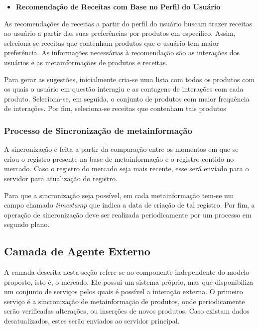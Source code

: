 \begin{itemize} 
    \item \textbf{Recomendação de Receitas com Base no Perfil do Usuário}
\end{itemize}

As recomendações de receitas a partir do perfil do usuário buscam trazer receitas ao usuário a partir das suas preferências por produtos em específico. Assim, seleciona-se receitas que contenham produtos que o usuário tem maior preferência. As informações necessárias à recomendação são as interações dos usuários e as metainformações de produtos e receitas.

Para gerar as sugestões, inicialmente cria-se uma lista com todos os produtos com os quais o usuário em questão interagiu e as contagens de interações com cada produto. Seleciona-se, em seguida, o conjunto de produtos com maior frequência de interações. Por fim, seleciona-se receitas que contenham tais produtos%

\ProximoForaDoSumario 
\subsubsection{Processo de Sincronização de metainformação}

A sincronização é feita a partir da comparação entre os momentos em que se criou o registro presente na base de metainformação e o registro contido no mercado. Caso o registro do mercado seja mais recente, esse será enviado para o servidor para atualização do registro. 

Para que a sincronização seja possível, em cada metainformação tem-se um campo chamado  \textit{timestamp} que indica a data de criação de tal registro. Por fim, a operação de sincronização deve ser realizada periodicamente por um processo em segundo plano. 


\subsection{Camada de Agente Externo}

A camada descrita nesta seção refere-se ao componente independente do modelo proposto, isto é, o mercado. Ele possui um sistema próprio, mas que disponibiliza um conjunto de serviços pelos quais é possível a interação externa. O primeiro serviço é a sincronização de metainformação de produtos, onde periodicamente serão verificadas alterações, ou inserções de novos produtos. Caso existam dados desatualizados, estes serão enviados ao servidor principal.

